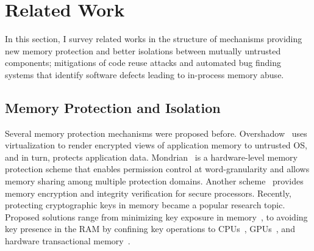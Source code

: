 \section{Related Work}
\label{sec:related_work}

In this section, I survey related works in the structure of mechanisms providing new memory protection and better isolations between mutually untrusted components; mitigations of code reuse attacks and automated bug finding systems that identify software defects leading to in-process memory abuse.

\subsection{Memory Protection and Isolation}
Several memory protection mechanisms were proposed before. Overshadow~\cite{chen2008overshadow} uses virtualization to render encrypted views of application memory to untrusted OS, and in turn, protects application data. Mondrian~\cite{mondrian} is a hardware-level memory protection scheme that enables permission control at word-granularity and allows memory sharing among multiple protection domains. Another scheme~\cite{suh2003efficient} provides memory encryption and integrity verification for secure processors.
Recently, protecting cryptographic keys in memory became a popular research topic. Proposed solutions range from minimizing key exposure in memory~\cite{harrison2007protecting,heartbleedpatch,securestring}, to avoiding key presence in the RAM by confining key operations to CPUs~\cite{muller2011tresor,guan2014copker}, GPUs~\cite{vasiliadis2014pixelvault}, and hardware transactional memory~\cite{Mimosa15}.

